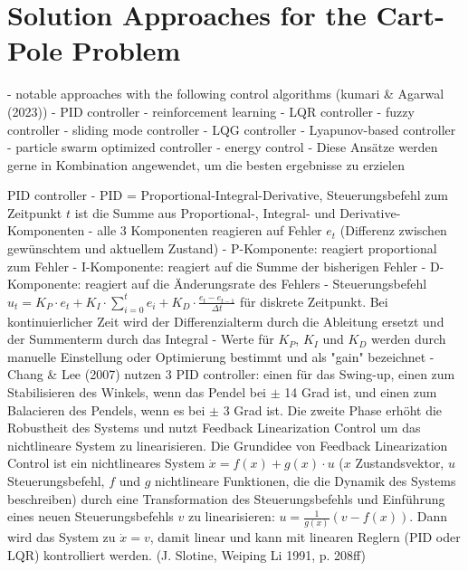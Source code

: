 \section{Solution Approaches for the Cart-Pole Problem}

- notable approaches with the following control algorithms (kumari & Agarwal (2023))
- PID controller
- reinforcement learning
- LQR controller
- fuzzy controller
- sliding mode controller
- LQG controller
- Lyapunov-based controller
- particle swarm optimized controller
- energy control
- Diese Ansätze werden gerne in Kombination angewendet, um die besten ergebnisse zu erzielen

PID controller
- PID = Proportional-Integral-Derivative, Steuerungsbefehl zum Zeitpunkt $t$ ist die Summe aus Proportional-, Integral- und Derivative-Komponenten
- alle 3 Komponenten reagieren auf Fehler $e_t$ (Differenz zwischen gewünschtem und aktuellem Zustand)
- P-Komponente: reagiert proportional zum Fehler
- I-Komponente: reagiert auf die Summe der bisherigen Fehler
- D-Komponente: reagiert auf die Änderungsrate des Fehlers
- Steuerungsbefehl $u_t = K_P\cdot e_t + K_I\cdot\sum_{i=0}^t e_i + K_D\cdot\frac{e_t - e_{t-1}}{\Delta t}$ für diskrete Zeitpunkt. Bei kontinuierlicher Zeit wird der Differenzialterm durch die Ableitung ersetzt und der Summenterm durch das Integral
- Werte für $K_P$, $K_I$ und $K_D$ werden durch manuelle Einstellung oder Optimierung bestimmt und als "gain" bezeichnet
- Chang & Lee (2007) nutzen 3 PID controller:  einen für das Swing-up, einen zum Stabilisieren des Winkels, wenn das Pendel bei $\pm$ 14 Grad ist, und einen zum Balacieren des Pendels, wenn es bei $\pm$ 3 Grad ist. Die zweite Phase erhöht die Robustheit des Systems und nutzt Feedback Linearization Control um das nichtlineare System zu linearisieren. Die Grundidee von Feedback Linearization Control ist ein nichtlineares System $\dot{x} = f(x) + g(x)\cdot u$ ($x$ Zustandsvektor, $u$ Steuerungsbefehl, $f$ und $g$ nichtlineare Funktionen, die die Dynamik des Systems beschreiben) durch eine Transformation des Steuerungsbefehls und Einführung eines neuen Steuerungsbefehls $v$ zu linearisieren: $u = \frac{1}{g(x)}(v - f(x))$. Dann wird das System zu $\dot{x}=v$, damit linear und kann mit linearen Reglern (PID oder LQR) kontrolliert werden. (J. Slotine, Weiping Li 1991, p. 208ff)

